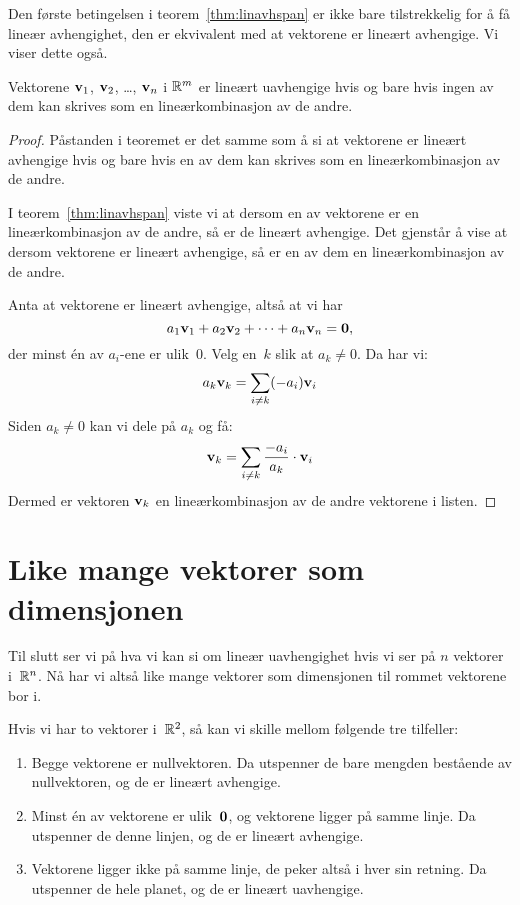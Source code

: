 Den første betingelsen i teorem~\ref{thm:linavhspan} er ikke bare
tilstrekkelig for å få lineær avhengighet, den er ekvivalent med at
vektorene er lineært avhengige.  Vi viser dette også.

\begin{thm}
\label{thm:lin-uavh-lin-komb}
Vektorene $\mathbf{v}_1$, $\mathbf{v}_2$, \ldots, $\mathbf{v}_n$ i $\mathbb{R}^m$ er lineært
uavhengige hvis og bare hvis ingen av dem kan skrives som en
lineærkombinasjon av de andre.
\end{thm}
\begin{proof}
Påstanden i teoremet er det samme som å si at vektorene er lineært
avhengige hvis og bare hvis en av dem kan skrives som en
lineærkombinasjon av de andre.

I teorem~\ref{thm:linavhspan} viste vi at dersom en av vektorene er en
lineærkombinasjon av de andre, så er de lineært avhengige.  Det
gjenstår å vise at dersom vektorene er lineært avhengige, så er en av
dem en lineærkombinasjon av de andre.

Anta at vektorene er lineært avhengige, altså at vi har
\[
a_1 \mathbf{v}_1 + a_2 \mathbf{v}_2 + \cdots + a_n \mathbf{v}_n = \mathbf{0},
\]
der minst én av $a_i$-ene er ulik~$0$.  Velg en~$k$ slik at $a_k \ne 0$.
Da har vi:
\[
a_k \mathbf{v}_k = \sum_{i \ne k} (-a_i) \mathbf{v}_i
\]
Siden $a_k \ne 0$ kan vi dele på $a_k$ og få:
\[
\mathbf{v}_k = \sum_{i \ne k} \frac{-a_i}{a_k} \cdot \mathbf{v}_i
\]
Dermed er vektoren $\mathbf{v}_k$ en lineærkombinasjon av de andre
vektorene i listen.
\end{proof}


\section*{Like mange vektorer som dimensjonen}

Til slutt ser vi på hva vi kan si om lineær uavhengighet hvis vi ser
på $n$ vektorer i~$\mathbb{R}^n$.  Nå har vi altså like mange vektorer som
dimensjonen til rommet vektorene bor i.

Hvis vi har to vektorer i~$\mathbb{R}^2$, så kan vi skille mellom følgende tre
tilfeller:
\begin{enumerate}
\item Begge vektorene er nullvektoren.  Da utspenner de bare mengden
bestående av nullvektoren, og de er lineært avhengige.
\item Minst én av vektorene er ulik~$\mathbf{0}$, og vektorene ligger på
samme linje.  Da utspenner de denne linjen, og de er lineært
avhengige.
\item Vektorene ligger ikke på samme linje, de peker altså i hver sin
retning.  Da utspenner de hele planet, og de er lineært uavhengige.
\end{enumerate}

